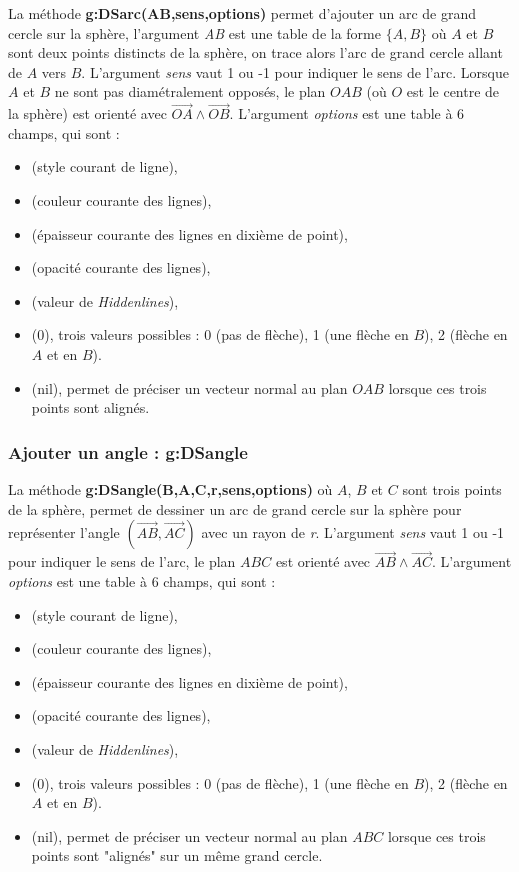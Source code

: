 La méthode \textbf{g:DSarc(AB,sens,options)} permet d'ajouter un arc de grand cercle sur la sphère, l'argument \emph{AB} est une table de la forme $\{A,B\}$ où $A$ et $B$ sont deux points distincts de la sphère, on trace alors l'arc de grand cercle allant de $A$ vers $B$. L'argument \emph{sens} vaut 1 ou -1 pour indiquer le sens de l'arc. Lorsque $A$ et $B$ ne sont pas diamétralement opposés, le plan $OAB$ (où $O$ est le centre de la sphère) est orienté avec $\vec{OA}\wedge\vec{OB}$.  L'argument \emph{options} est une table à 6 champs, qui sont :
    \begin{itemize}
        \item {} (style courant de ligne), 
        \item {} (couleur courante des lignes),
        \item {} (épaisseur courante des lignes en dixième de point),
        \item {} (opacité courante des lignes),
        \item {} (valeur de \emph{Hiddenlines}),
        \item {} (0), trois valeurs possibles : 0 (pas de flèche), 1 (une flèche en $B$), 2 (flèche en $A$ et en $B$).
        \item {} (nil), permet de préciser un vecteur normal au plan $OAB$ lorsque ces trois points sont alignés.
    \end{itemize}

\subsubsection{Ajouter un angle : g:DSangle}

La méthode \textbf{g:DSangle(B,A,C,r,sens,options)} où $A$, $B$ et $C$ sont trois points de la sphère, permet de dessiner un arc de grand cercle sur la sphère pour représenter l'angle $(\vec{AB},\vec{AC})$ avec un rayon de \emph{r}. L'argument \emph{sens} vaut 1 ou -1 pour indiquer le sens de l'arc, le plan $ABC$ est orienté avec $\vec{AB}\wedge\vec{AC}$.  L'argument \emph{options} est une table à 6 champs, qui sont :
    \begin{itemize}
        \item {} (style courant de ligne), 
        \item {} (couleur courante des lignes),
        \item {} (épaisseur courante des lignes en dixième de point),
        \item {} (opacité courante des lignes),
        \item {} (valeur de \emph{Hiddenlines}),
        \item {} (0), trois valeurs possibles : 0 (pas de flèche), 1 (une flèche en $B$), 2 (flèche en $A$ et en $B$).
        \item {} (nil), permet de préciser un vecteur normal au plan $ABC$ lorsque ces trois points sont "alignés" sur un même grand cercle.
    \end{itemize}
    
